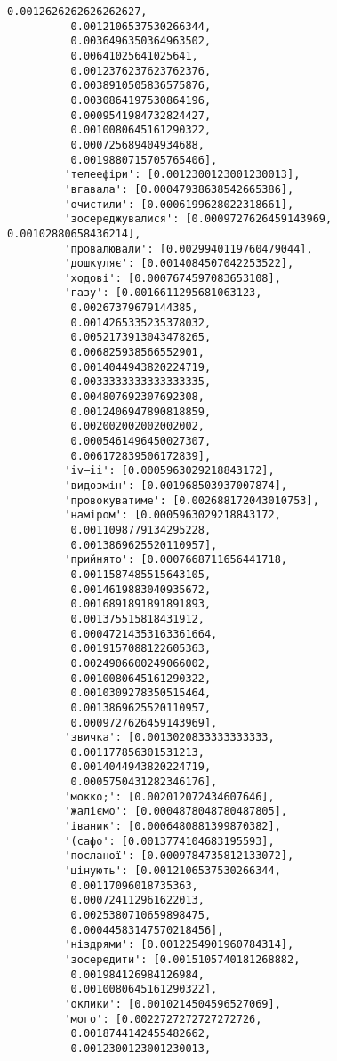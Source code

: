 \documentclass[11pt]{article}
\begin{document}
\begin{Verbatim}[commandchars=\\\{\}]
          0.0012626262626262627,
          0.0012106537530266344,
          0.0036496350364963502,
          0.00641025641025641,
          0.0012376237623762376,
          0.0038910505836575876,
          0.0030864197530864196,
          0.0009541984732824427,
          0.0010080645161290322,
          0.000725689404934688,
          0.0019880715705765406],
         'телеефіри': [0.0012300123001230013],
         'вгавала': [0.00047938638542665386],
         'очистили': [0.0006199628022318661],
         'зосереджувалися': [0.0009727626459143969, 0.00102880658436214],
         'провалювали': [0.0029940119760479044],
         'дошкуляє': [0.0014084507042253522],
         'ходові': [0.0007674597083653108],
         'газу': [0.0016611295681063123,
          0.00267379679144385,
          0.0014265335235378032,
          0.0052173913043478265,
          0.006825938566552901,
          0.0014044943820224719,
          0.0033333333333333335,
          0.004807692307692308,
          0.0012406947890818859,
          0.002002002002002002,
          0.0005461496450027307,
          0.006172839506172839],
         'iv—ii': [0.0005963029218843172],
         'видозмін': [0.001968503937007874],
         'провокуватиме': [0.002688172043010753],
         'наміром': [0.0005963029218843172,
          0.0011098779134295228,
          0.0013869625520110957],
         'прийнято': [0.0007668711656441718,
          0.0011587485515643105,
          0.0014619883040935672,
          0.0016891891891891893,
          0.001375515818431912,
          0.00047214353163361664,
          0.0019157088122605363,
          0.0024906600249066002,
          0.0010080645161290322,
          0.0010309278350515464,
          0.0013869625520110957,
          0.0009727626459143969],
         'звичка': [0.0013020833333333333,
          0.001177856301531213,
          0.0014044943820224719,
          0.0005750431282346176],
         'мокко;': [0.002012072434607646],
         'жаліємо': [0.0004878048780487805],
         'іваник': [0.0006480881399870382],
         '(сафо': [0.0013774104683195593],
         'посланої': [0.0009784735812133072],
         'цінують': [0.0012106537530266344,
          0.00117096018735363,
          0.000724112961622013,
          0.0025380710659898475,
          0.00044583147570218456],
         'ніздрями': [0.0012254901960784314],
         'зосередити': [0.0015105740181268882,
          0.001984126984126984,
          0.0010080645161290322],
         'оклики': [0.0010214504596527069],
         'мого': [0.0022727272727272726,
          0.0018744142455482662,
          0.0012300123001230013,

\end{Verbatim}
\end{document}
